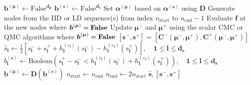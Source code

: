 \documentclass[graybox]{svmult}
\begin{document}
\begin{algorithm}[t]
\begin{algorithmic}
    \State $\boldsymbol{b}^{(\boldsymbol{\mu})} \gets \text{False}^{\boldsymbol{d}_{\boldsymbol{\mu}}}$ 
    \State $\boldsymbol{b}^{(\boldsymbol{s})} \gets \text{False}^{\boldsymbol{d}_{\boldsymbol{s}}}$ 
    \State Set $\boldsymbol{\alpha}^{(\boldsymbol{\mu})}$ based on $\boldsymbol{\alpha}^{(\boldsymbol{s})}$ using $\boldsymbol{D}$ 
     
        \State Generate nodes from the IID or LD sequence(s) from index $n_\text{start}$ to $n_\text{end}-1$
        \State Evaluate $\boldsymbol{f}$ at the new nodes where $\boldsymbol{b}^{(\boldsymbol{\mu})}=\textbf{\text{False}}$ 
        \State Update $\boldsymbol{\mu}^-$ and $\boldsymbol{\mu}^+$ using the scalar CMC or QMC algorithms where $\boldsymbol{b}^{(\boldsymbol{\mu})}=\textbf{\text{False}}$
        \State $[\boldsymbol{s}^-,\boldsymbol{s}^+] = \left[\boldsymbol{C}^-(\boldsymbol{\mu}^-,\boldsymbol{\mu}^+),\boldsymbol{C}^+(\boldsymbol{\mu}^-,\boldsymbol{\mu}^+)\right]$ 
        \State $\hat{s}_{\boldsymbol{l}} \gets \frac{1}{2}\left[s_{\boldsymbol{l}}^-+s_{\boldsymbol{l}}^++h^{(\varepsilon_{\boldsymbol{l}})}_{\boldsymbol{l}}(s_{\boldsymbol{l}}^-)-h^{(\varepsilon_{\boldsymbol{l}})}_{\boldsymbol{l}}(s_{\boldsymbol{l}}^+)\right], \quad\boldsymbol{1} \leq \boldsymbol{l} \leq \boldsymbol{d}_{\boldsymbol{s}}$ 
        \State $b^{(\boldsymbol{s})}_{\boldsymbol{l}} \gets \text{Boolean}\left(s_{\boldsymbol{l}}^+-s_{\boldsymbol{l}}^- < h^{(\varepsilon_{\boldsymbol{l}})}_{\boldsymbol{l}}(s_{\boldsymbol{l}}^-)+h^{(\varepsilon_{\boldsymbol{l}})}_{\boldsymbol{l}}(s_{\boldsymbol{l}}^+)\right),\quad \boldsymbol{1} \leq \boldsymbol{l} \leq \boldsymbol{d}_{\boldsymbol{s}}$ 
        \State $\boldsymbol{b}^{(\boldsymbol{\mu})} \gets \boldsymbol{D}\left(\boldsymbol{b}^{(\boldsymbol{s})}\right)$
        \State $n_\text{start} \gets n_\text{end}$
        \State $n_\text{end} \gets 2n_\text{start}$
    \EndWhile
    \State \Return $\hat{\boldsymbol{s}},[\boldsymbol{s}^-,\boldsymbol{s}^+]$
    \end{algorithmic}
\end{algorithm}
\end{document}
